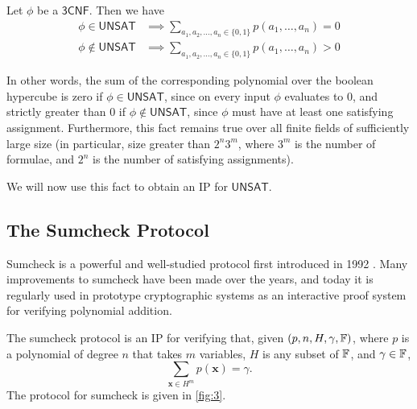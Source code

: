 Let $\phi$ be a $\mathsf{3CNF}$. Then we have
\begin{align*}
	\phi\in\mathsf{UNSAT}&\implies\sum_{a_1,a_2,\dots,a_n\in\{0,1\}}p(a_1,\dots,a_n)=0\\ \phi\notin\mathsf{UNSAT}&\implies\sum_{a_1,a_2,\dots,a_n\in\{0,1\}}p(a_1,\dots,a_n)>0
\end{align*}

In other words, the sum of the corresponding polynomial over the boolean hypercube is zero if $\phi\in\mathsf{UNSAT}$, since on every input $\phi$ evaluates to $0$, and strictly greater than $0$ if $\phi\notin\mathsf{UNSAT}$, since $\phi$ must have at least one satisfying assignment. Furthermore, this fact remains true over all finite fields of sufficiently large size (in particular, size greater than $2^n3^m$, where $3^m$ is the number of formulae, and $2^n$ is the number of satisfying assignments).

We will now use this fact to obtain an IP for $\mathsf{UNSAT}$.

\subsection{The Sumcheck Protocol}

Sumcheck is a powerful and well-studied protocol first introduced in 1992 \cite{10.1145/146585.146605}. Many improvements to sumcheck have been made over the years, and today it is regularly used in prototype cryptographic systems as an interactive proof system for verifying polynomial addition.

\begin{definition}[Sumcheck.]
	The sumcheck protocol is an IP for verifying that, given $(p,n,H,\gamma,\mathbb{F})$, where $p$ is a polynomial of degree $n$ that takes $m$ variables, $H$ is any subset of $\mathbb{F}$, and $\gamma\in\mathbb{F}$,
	$$\sum_{\mathbf{x}\in H^m}p(\mathbf{x})=\gamma.$$
	The protocol for sumcheck is given in \ref{fig:3}.
\end{definition}


